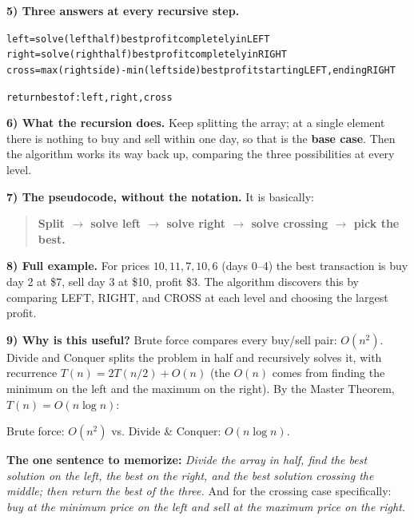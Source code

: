 \documentclass[11pt]{article}
\begin{document}
\textbf{5) Three answers at every recursive step.}
\begin{alltt}
left  = solve(left half)                  best profit completely in LEFT
right = solve(right half)                 best profit completely in RIGHT
cross = max(right side) - min(left side)  best profit starting LEFT, ending RIGHT

return best of: left, right, cross
\end{alltt}

\textbf{6) What the recursion does.} Keep splitting the array; at a single element there is
nothing to buy and sell within one day, so that is the \textbf{base case}. Then the algorithm
works its way back up, comparing the three possibilities at every level.

\textbf{7) The pseudocode, without the notation.} It is basically:
\begin{quote}
\textbf{Split $\to$ solve left $\to$ solve right $\to$ solve crossing $\to$ pick the best.}
\end{quote}

\textbf{8) Full example.} For prices $10, 11, 7, 10, 6$ (days 0--4) the best transaction is
buy day 2 at \$7, sell day 3 at \$10, profit \$3. The algorithm discovers this by comparing
LEFT, RIGHT, and CROSS at each level and choosing the largest profit.

\textbf{9) Why is this useful?} Brute force compares every buy/sell pair: $O(n^2)$. Divide and
Conquer splits the problem in half and recursively solves it, with recurrence
$T(n) = 2T(n/2) + O(n)$ (the $O(n)$ comes from finding the minimum on the left and the maximum
on the right). By the Master Theorem, $T(n) = O(n \log n)$:
\begin{center}
  Brute force: $O(n^2)$ \qquad vs. \qquad Divide \& Conquer: $O(n \log n)$.
\end{center}

\textbf{The one sentence to memorize:} \emph{Divide the array in half, find the best solution
on the left, the best on the right, and the best solution crossing the middle; then return the
best of the three.} And for the crossing case specifically: \emph{buy at the minimum price on
the left and sell at the maximum price on the right.}
\end{document}
